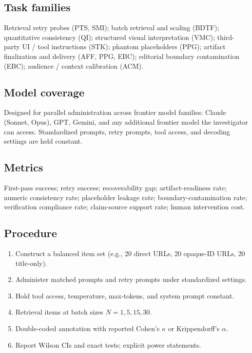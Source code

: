 \documentclass[11pt]{article}
\begin{document}
\subsection{Task families}
Retrieval retry probes (PTS, SMI); batch retrieval and scaling (BDTF); quantitative consistency (QI); structured visual interpretation (VMC); third-party UI / tool instructions (STK); phantom placeholders (PPG); artifact finalization and delivery (AFF, PPG, EBC); editorial boundary contamination (EBC); audience / context calibration (ACM).

\subsection{Model coverage}
Designed for parallel administration across frontier model families: Claude (Sonnet, Opus), GPT, Gemini, and any additional frontier model the investigator can access. Standardized prompts, retry prompts, tool access, and decoding settings are held constant.

\subsection{Metrics}
First-pass success; retry success; recoverability gap; artifact-readiness rate; numeric consistency rate; placeholder leakage rate; boundary-contamination rate; verification compliance rate; claim-source support rate; human intervention cost.

\subsection{Procedure}
\begin{enumerate}[leftmargin=*, label=\arabic*.]
  \item Construct a balanced item set (e.g., 20 direct URLs, 20 opaque-ID URLs, 20 title-only).
  \item Administer matched prompts and retry prompts under standardized settings.
  \item Hold tool access, temperature, max-tokens, and system prompt constant.
  \item Retrieval items at batch sizes $N=1,5,15,30$.
  \item Double-coded annotation with reported Cohen's $\kappa$ or Krippendorff's $\alpha$.
  \item Report Wilson CIs and exact tests; explicit power statements.
\end{enumerate}
\end{document}
